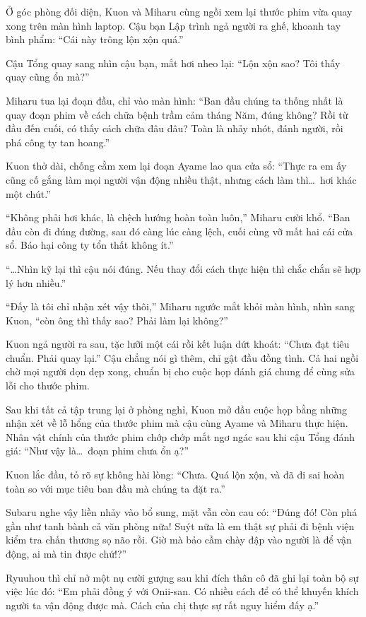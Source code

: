 \documentclass[../main.tex]{subfiles}
\begin{document}
Ở góc phòng đối diện, Kuon và Miharu cùng ngồi xem lại thước phim vừa quay xong trên màn hình laptop. Cậu bạn Lập trình ngả người ra ghế, khoanh tay bình phẩm: ``Cái này trông lộn xộn quá.''

Cậu Tổng quay sang nhìn cậu bạn, mắt hơi nheo lại: ``Lộn xộn sao? Tôi thấy quay cũng ổn mà?''

Miharu tua lại đoạn đầu, chỉ vào màn hình: ``Ban đầu chúng ta thống nhất là quay đoạn phim về cách chữa bệnh trầm cảm tháng Năm, đúng không? Rồi từ đầu đến cuối, có thấy cách chữa đâu đâu? Toàn là nhảy nhót, đánh người, rồi phá công ty tan hoang.''

Kuon thở dài, chống cằm xem lại đoạn Ayame lao qua cửa sổ: ``Thực ra em ấy cũng cố gắng làm mọi người vận động nhiều thật, nhưng cách làm thì\dots\ hơi khác một chút.''

``Không phải hơi khác, là chệch hướng hoàn toàn luôn,'' Miharu cười khổ. ``Ban đầu còn đi đúng đường, sau đó càng lúc càng lệch, cuối cùng vỡ mất hai cái cửa sổ. Báo hại công ty tổn thất không ít.''

``\dots Nhìn kỹ lại thì cậu nói đúng. Nếu thay đổi cách thực hiện thì chắc chắn sẽ hợp lý hơn nhiều.''

``Đấy là tôi chỉ nhận xét vậy thôi,'' Miharu ngước mắt khỏi màn hình, nhìn sang Kuon, ``còn ông thì thấy sao? Phải làm lại không?''

Kuon ngả người ra sau, tặc lưỡi một cái rồi kết luận dứt khoát: ``Chưa đạt tiêu chuẩn. Phải quay lại.'' Cậu chẳng nói gì thêm, chỉ gật đầu đồng tình. Cả hai ngồi chờ mọi người dọn dẹp xong, chuẩn bị cho cuộc họp đánh giá chung để cùng sửa lỗi cho thước phim.

\ct

Sau khi tất cả tập trung lại ở phòng nghỉ, Kuon mở đầu cuộc họp bằng những nhận xét về lỗ hổng của thước phim mà cậu cùng Ayame và Miharu thực hiện. Nhân vật chính của thước phim chớp chớp mắt ngơ ngác sau khi cậu Tổng đánh giá: ``Như vậy là\dots\ đoạn phim chưa ổn ạ?''

Kuon lắc đầu, tỏ rõ sự không hài lòng: ``Chưa. Quá lộn xộn, và đã đi sai hoàn toàn so với mục tiêu ban đầu mà chúng ta đặt ra.''

Subaru nghe vậy liền nhảy vào bổ sung, mặt vẫn còn cau có: ``Đúng đó! Còn phá gần như tanh bành cả văn phòng nữa! Suýt nữa là em thật sự phải đi bệnh viện kiểm tra chấn thương sọ não rồi. Giờ mà bảo cầm chày đập vào người là để vận động, ai mà tin được chứ!?''

Ryuuhou thì chỉ nở một nụ cười gượng sau khi đích thân cô đã ghi lại toàn bộ sự việc lúc đó: ``Em phải đồng ý với Onii-san. Có nhiều cách để có thể khuyến khích người ta vận động được mà. Cách của chị thực sự rất nguy hiểm đấy ạ.''
\end{document}
